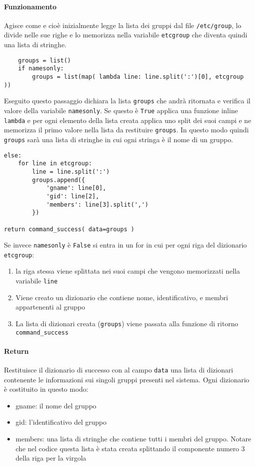 \documentclass[11pt]{article}
\begin{document}
\paragraph{Funzionamento}
Agisce come  e cioè inizialmente legge la lista dei gruppi dal file \texttt{/etc/group}, lo divide
nelle sue righe e lo memorizza nella variabile \texttt{etcgroup} che diventa quindi una lista di stringhe.
\begin{lstlisting}
    groups = list()
    if namesonly:
        groups = list(map( lambda line: line.split(':')[0], etcgroup ))
\end{lstlisting}
Eseguito questo passaggio dichiara la lista \texttt{groups} che andrà ritornata e verifica il valore della variabile \texttt{namesonly}.
Se questo è \texttt{True} applica una funzione inline \texttt{lambda} e per ogni elemento della lista creata
applica uno split dei suoi campi e ne memorizza il primo valore nella lista da restituire \texttt{groups}. In questo modo
quindi \texttt{groups} sarà una lista di stringhe in cui ogni stringa è il nome di un gruppo.
\begin{lstlisting}
else:
    for line in etcgroup:
        line = line.split(':')
        groups.append({
            'gname': line[0],
            'gid': line[2],
            'members': line[3].split(',')
        })

return command_success( data=groups )
\end{lstlisting}
Se invece \texttt{namesonly} è \texttt{False} si entra in un for in cui per ogni riga del dizionario \texttt{etcgroup}:
\begin{enumerate}
	\item{la riga stessa viene splittata nei suoi campi che vengono memorizzati nella variabile \texttt{line}}
	\item{Viene creato un dizionario che contiene nome, identificativo, e membri appartenenti al gruppo}
	\item{La lista di dizionari creata (\texttt{groups}) viene passata alla funzione di ritorno \texttt{command\_success}}
\end{enumerate}
\paragraph{Return}
Restituisce il dizionario di successo con al campo \texttt{data} una lista di dizionari contenente le informazioni
sui singoli gruppi presenti nel sistema. Ogni dizionario è costituito in questo modo:
\begin{itemize}
	\item{gname: il nome del gruppo}
	\item{gid: l'identificativo del gruppo}
	\item{members: una lista di stringhe che contiene tutti i membri del gruppo. Notare che nel codice questa lista
		è stata creata splittando il componente numero 3 della riga per la virgola}
\end{itemize}
\end{document}
